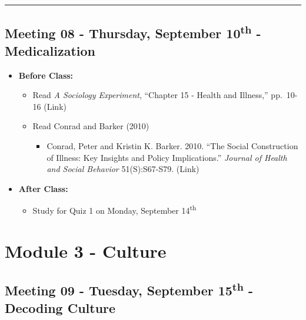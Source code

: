 \documentclass[
]{book}
\providecommand{\tightlist}{%
  \setlength{\itemsep}{0pt}\setlength{\parskip}{0pt}}
\begin{document}
\begin{center}\rule{0.5\linewidth}{0.5pt}\end{center}

\hypertarget{meeting-08---thursday-september-10th---medicalization}{%
\subsection*{\texorpdfstring{Meeting 08 - Thursday, September 10\textsuperscript{th} - Medicalization}{Meeting 08 - Thursday, September 10th - Medicalization}}\label{meeting-08---thursday-september-10th---medicalization}}

\begin{itemize}
\tightlist
\item
  \textbf{Before Class:}

  \begin{itemize}
  \tightlist
  \item
    Read \emph{A Sociology Experiment}, ``Chapter 15 - Health and Illness,'' pp.~10-16 (Link)
  \item
    Read Conrad and Barker (2010)

    \begin{itemize}
    \tightlist
    \item
      Conrad, Peter and Kristin K. Barker. 2010. ``The Social Construction of Illness: Key Insights and Policy Implications.'' \emph{Journal of Health and Social Behavior} 51(S):S67-S79. (Link)
    \end{itemize}
  \end{itemize}
\item
  \textbf{After Class:}

  \begin{itemize}
  \tightlist
  \item
    Study for Quiz 1 on Monday, September 14\textsuperscript{th}
  \end{itemize}
\end{itemize}

\newpage

\hypertarget{module-3---culture}{%
\section{Module 3 - Culture}\label{module-3---culture}}

\hypertarget{meeting-09---tuesday-september-15th---decoding-culture}{%
\subsection*{\texorpdfstring{Meeting 09 - Tuesday, September 15\textsuperscript{th} - Decoding Culture}{Meeting 09 - Tuesday, September 15th - Decoding Culture}}\label{meeting-09---tuesday-september-15th---decoding-culture}}
\end{document}
